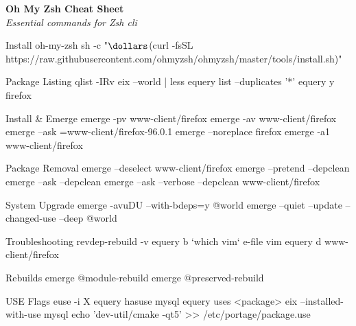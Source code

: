 \documentclass[10pt]{article}
\begin{document}
\pagestyle{empty}
\begin{center}
	 \hspace{1em}
	{\Huge\textbf{\textcolor{mygreen}{Oh My Zsh Cheat Sheet}}}
	\hspace{1em} \\
	\vspace{5pt}
	{\small\textit{Essential commands for Zsh cli}}
\end{center}

\begin{multicols}{2}

\begin{cheatbox}{Install oh-my-zsh}
  sh -c "$\dollars$(curl -fsSL https://raw.githubusercontent.com/ohmyzsh/ohmyzsh/master/tools/install.sh)"
\end{cheatbox}

\begin{cheatbox}{Package Listing}
qlist -IRv
eix --world | less
equery list --duplicates '*'
equery y firefox
\end{cheatbox}

\begin{cheatbox}{Install \& Emerge}
emerge -pv www-client/firefox
emerge -av www-client/firefox
emerge --ask =www-client/firefox-96.0.1
emerge --noreplace firefox
emerge -a1 www-client/firefox
\end{cheatbox}

\begin{cheatbox}{Package Removal}
emerge --deselect www-client/firefox
emerge --pretend --depclean
emerge --ask --depclean
emerge --ask --verbose --depclean www-client/firefox
\end{cheatbox}

\begin{cheatbox}{System Upgrade}
emerge -avuDU --with-bdeps=y @world
emerge --quiet --update --changed-use --deep @world
\end{cheatbox}

\begin{cheatbox}{Troubleshooting}
revdep-rebuild -v
equery b `which vim`
e-file vim
equery d www-client/firefox
\end{cheatbox}

\begin{cheatbox}{Rebuilds}
emerge @module-rebuild
emerge @preserved-rebuild
\end{cheatbox}

\begin{cheatbox}{USE Flags}
euse -i X
equery hasuse mysql
equery uses <package>
eix --installed-with-use mysql
echo 'dev-util/cmake -qt5' >> /etc/portage/package.use
\end{cheatbox}


\end{multicols}
\end{document}
